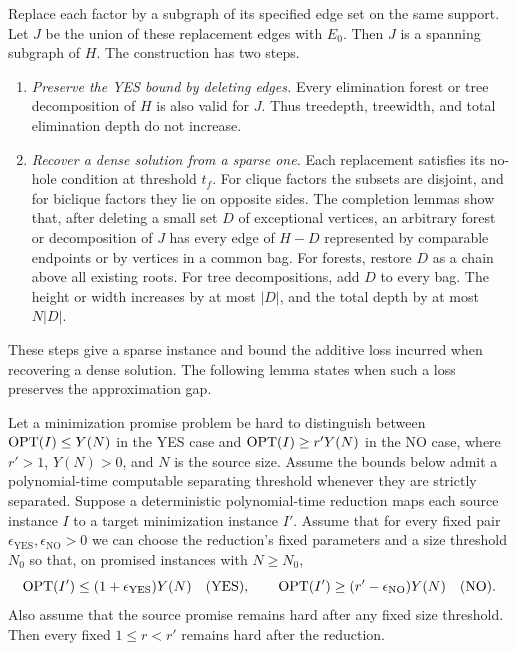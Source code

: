 Replace each factor by a subgraph of its specified edge set on
the same support. Let $J$ be the union of these replacement edges
with $E_0$. Then $J$ is a spanning subgraph of $H$. The construction
has two steps.
\begin{enumerate}
 \item \emph{Preserve the YES bound by deleting edges.}
   Every elimination forest or tree decomposition of $H$ is also
   valid for $J$. Thus treedepth, treewidth, and total elimination
   depth do not increase.
 \item \emph{Recover a dense solution from a sparse one.}
   Each replacement satisfies its no-hole condition at threshold
   $t_f$. For clique factors the subsets are disjoint, and for
   biclique factors they lie on opposite sides.
   The completion lemmas show that, after deleting a small set $D$
   of exceptional vertices, an arbitrary forest or decomposition
   of $J$ has every edge of $H-D$ represented by comparable
   endpoints or by vertices in a common bag. For forests,
   restore $D$ as a chain above all existing roots. For tree
   decompositions, add $D$ to every bag. The height or width
    increases by at most $|D|$, and the total depth by at most
    $N|D|$.
\end{enumerate}

These steps give a sparse instance and bound the additive
loss incurred when recovering a dense solution. The following lemma
states when such a loss preserves the approximation gap.

\begin{lemma}
\label{lem:gap-preservation}
Let a minimization promise problem be hard to distinguish between
$\operatorname{OPT}(I)\le Y(N)$ in the YES case and $\operatorname{OPT}(I)\ge r'Y(N)$ in the
NO case, where $r'>1$, $Y(N)>0$, and $N$ is the source size.
Assume the bounds below admit a polynomial-time computable separating
threshold whenever they are strictly separated.
Suppose a deterministic polynomial-time reduction maps each source
instance $I$ to a target minimization instance $I'$. Assume that for
every fixed pair $\epsilon_{\mathrm{YES}},\epsilon_{\mathrm{NO}}>0$ we
can choose the reduction's fixed parameters and a size threshold
$N_0$ so that, on promised instances with $N\ge N_0$,
\[
 \operatorname{OPT}(I')\le(1+\epsilon_{\mathrm{YES}})Y(N)\quad(\text{YES}),\qquad
 \operatorname{OPT}(I')\ge(r'-\epsilon_{\mathrm{NO}})Y(N)\quad(\text{NO}).
\]
Also assume that the source promise remains hard after any fixed size
threshold. Then every fixed $1\le r<r'$ remains hard after the
reduction.
\end{lemma}

